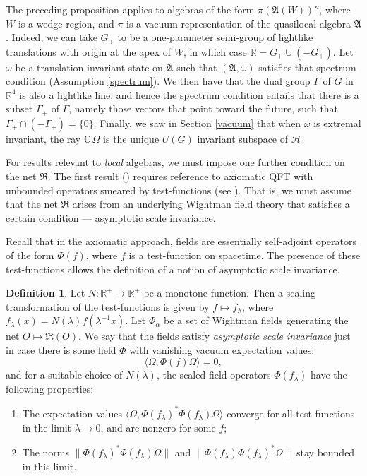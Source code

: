 \documentclass[11pt]{article}
\newcommand{\alg}[1]{\mathfrak{#1}}
\newcommand{\norm}[1]{\| #1\|}
\theoremstyle{definition}
\theoremstyle{definition}
\newtheorem{defn}[thm]{Definition}
\theoremstyle{remark}
\def\2#1{{\mathcal #1}}
\def\7#1{{\mathbb #1}}
\def\al#1{{\mathfrak #1}}
\def\a{\alpha} \def\b{\beta} \def\g{\gamma} \def\d{\delta}
\def\om{\omega} \def\Om{\Omega} \def\dd{\partial} \def\D{\Delta}
\begin{document}
The preceding proposition applies to algebras of the
form $\pi (\al A(W))''$, where $W$ is a wedge region,
and $\pi$ is a vacuum representation of the quasilocal
algebra $\al A$.  Indeed, we can take $G_+$ to be a
one-parameter semi-group of lightlike translations with
origin at the apex of $W$, in which case $\7R =G_+\cup
(-G_+)$.  Let $\om$ be a translation invariant state on
$\al A$ such that $(\al A,\om )$ satisfies that
spectrum condition (Assumption \ref{spectrum}).  We
then have that the dual group $\Gamma$ of $G$ in $\7R
^4$ is also a lightlike line, and hence the spectrum
condition entails that there is a subset $\Gamma _+$ of
$\Gamma$, namely those vectors that point toward the
future, such that $\Gamma _+\cap (-\Gamma _+)=\{ 0\}$.
Finally, we saw in Section \ref{vacuum} that when $\om$
is extremal invariant, the ray $\7C \,\Om$ is the
unique $U(G)$ invariant subspace of $\2H$.


For results relevant to \emph{local} algebras, we must impose one
further condition on the net $\al R$.  The first result
(\cite{typeIII}) requires reference to axiomatic QFT with unbounded
operators smeared by test-functions (see \cite{SW}).  That is, we must
assume that the net $\al R$ arises from an underlying Wightman field
theory that satisfies a certain condition --- asymptotic scale
invariance.

Recall that in the axiomatic approach, fields are essentially
self-adjoint operators of the form $\Phi (f)$, where $f$ is a
test-function on spacetime.  The presence of these test-functions allows
the definition of a notion of asymptotic scale invariance.

\begin{defn} Let $N:\7R ^+\to \7R^+$ be a monotone function.  Then a
  scaling transformation of the test-functions is given by $f\mapsto
  f_\lambda$, where $f_\lambda (x)=N(\lambda )f(\lambda ^{-1}x)$.  Let
  $\Phi _\a$ be a set of Wightman fields generating the net $O\mapsto
  \alg{R}(O)$.  We say that the fields satisfy \emph{asymptotic scale
    invariance} just in case there is some field $\Phi$ with vanishing
  vacuum expectation values:
$$ \bigl\langle \Om ,\Phi (f)\Om \rangle =0 ,$$
and for a suitable choice of $N(\lambda )$, the scaled field operators $\Phi
(f_\lambda )$ have the following properties:
\begin{enumerate}
\item The expectation values $\langle \Om ,\Phi
  (f_\lambda )^*\Phi (f_\lambda )\Om \rangle$ converge
  for all test-functions in the limit $\lambda \to 0$,
  and are nonzero for some $f$;
\item The norms $\norm{\Phi (f_\lambda )^*\Phi (f_\lambda )\Om }$ and $\norm{\Phi
    (f_\lambda )\Phi (f_\lambda )^*\Om }$ stay bounded in this limit.
\end{enumerate}
\end{defn}
\end{document}
